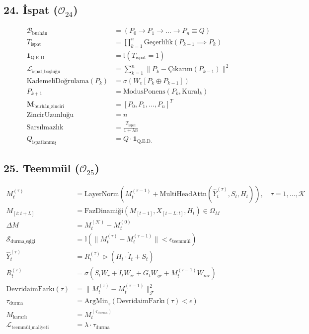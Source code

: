 \documentclass[11pt, a4paper]{article}
\begin{document}
\subsection{24. İspat ($\mathcal{O}_{24}$)}
\begin{align}
\mathcal{B}_{\text{burhân}} &= (P_0 \to P_1 \to \dots \to P_n \equiv Q) \\
T_{\text{ispat}} &= \prod_{k=1}^n \text{Geçerlilik}(P_{k-1} \implies P_k) \\
\mathbf{1}_{\text{Q.E.D.}} &= \mathbb{I}(T_{\text{ispat}} = 1) \\
\mathcal{L}_{\text{ispat\_boşluğu}} &= \sum_{k=1}^n \| P_k - \text{Çıkarım}(P_{k-1}) \|^2 \\
\text{KademeliDoğrulama}(P_k) &= \sigma(W_v [P_k \oplus P_{k-1}]) \\
P_{k+1} &= \text{ModusPonens}(P_k, \text{Kural}_k) \\
\mathbf{M}_{\text{burhân\_zinciri}} &= [P_0, P_1, \dots, P_n]^T \\
\text{ZincirUzunluğu} &= n \\
\text{Sarsılmazlık} &= \frac{T_{\text{ispat}}}{1 + \lambda n} \\
Q_{\text{ispatlanmış}} &= Q \cdot \mathbf{1}_{\text{Q.E.D.}}
\end{align}

\subsection{25. Teemmül ($\mathcal{O}_{25}$)}
\begin{align}
M_t^{(\tau)} &= \text{LayerNorm}\left( M_t^{(\tau-1)} + \text{MultiHeadAttn}(\hat{Y}_t^{(\tau)}, S_t, H_t) \right), \quad \tau = 1, \dots, \mathcal{K} \\
M_{[t:t+L]} &= \text{FazDinamiği}\left( M_{[t-1]}, X_{[t-L:t]}, H_t \right) \in \Omega_M \\
\Delta M &= M_t^{(\mathcal{K})} - M_t^{(0)} \\
\mathcal{S}_{\text{durma\_eşiği}} &= \mathbb{I}(\|M_t^{(\tau)} - M_t^{(\tau-1)}\| < \epsilon_{\text{teemmül}}) \\
\hat{Y}_t^{(\tau)} &= R_t^{(\tau)} \triangleright (H_t \cdot \dot{I}_t + S_t) \\
R_t^{(\tau)} &= \sigma(S_t W_r + \dot{I}_t W_{ir} + G_t W_{gr} + M_t^{(\tau-1)} W_{mr}) \\
\text{DevridaimFarkı}(\tau) &= \|M_t^{(\tau)} - M_t^{(\tau-1)}\|_{\mathcal{F}}^2 \\
\tau_{\text{durma}} &= \text{ArgMin}_{\tau} (\text{DevridaimFarkı}(\tau) < \epsilon) \\
M_{\text{kararlı}} &= M_t^{(\tau_{\text{durma}})} \\
\mathcal{L}_{\text{teemmül\_maliyeti}} &= \lambda \cdot \tau_{\text{durma}}
\end{align}
\end{document}
